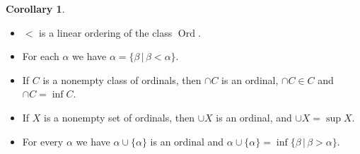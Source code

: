 \documentclass{article}
\theoremstyle{definition}
\newtheorem{crly}[thm]{Corollary}
\DeclareMathOperator{\Ord}{Ord}
\begin{document}
\newpage

\begin{crly}
    \hfill
    \begin{itemize}
        \item $<$ is a linear ordering of the class $\Ord$.
        \item For each $\alpha$ we have $\alpha =  \{\beta \, | \, \beta < \alpha\}$.
        \item If $C$ is a nonempty class of ordinals, then $\cap C$ is an ordinal, $\cap C \in C$ and $\cap C = \inf C$.
        \item If $X$ is a nonempty set of ordinals, then $\cup X$ is an ordinal, and $\cup X = \sup X$.
        \item For every $\alpha$ we have $\alpha \cup \{\alpha\}$ is an ordinal and $\alpha \cup \{\alpha\}  = \inf \{\beta \, | \, \beta > \alpha\}$. 
    \end{itemize}
\end{crly}
\end{document}
